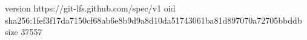 version https://git-lfs.github.com/spec/v1
oid sha256:1fef3f17da7150cf68ab6e8b9d9a8d10da51743061ba81d897070a72705bbddb
size 37557
